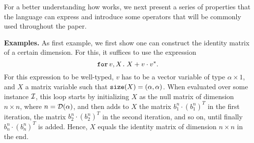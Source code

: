 %
%
%
%





For a better understanding how \langfor  works, we next present a series of properties that the language can express and introduce some operators that will be commonly used throughout the paper.


\smallskip
\noindent
\textbf{Examples.}
As first example, we first show one can construct the identity matrix of a certain dimension. For this, it suffices to use the expression $$\texttt{for}\, v,X \texttt{.}\, X + v\cdot v^*.$$ For this expression to be well-typed, $v$ has to be a vector variable of type $\alpha\times 1$, and $X$ a matrix variable such that $\texttt{size}(X) = (\alpha,\alpha)$. When evaluated over some instance $\mathcal{I}$, this loop starts by initializing $X$ as the null matrix of dimension $n\times n$, where $n=\mathcal{D}(\alpha)$, and then adds to $X$ the matrix $b_1^n\cdot (b_1^n)^T$ in the first iteration, the matrix $b_2^n\cdot (b_2^n)^T$ in the second iteration, and so on, until finally $b_n^n\cdot (b_n^n)^T$ is added. Hence, $X$ equals the identity matrix of dimension $n\times n$ in the end.

